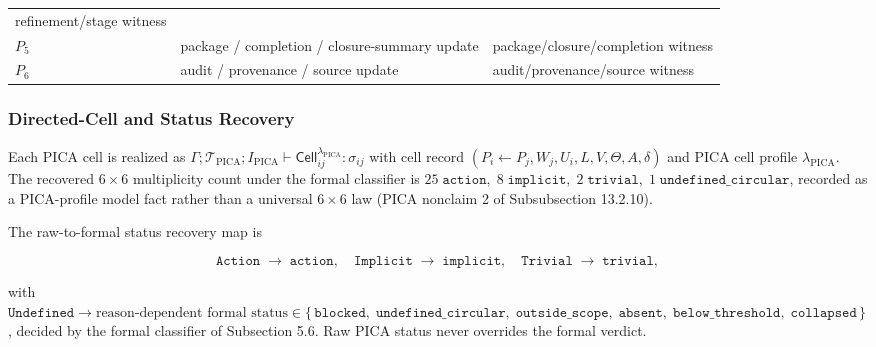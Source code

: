 \documentclass[11pt]{article}
\theoremstyle{definition}
\begin{document}
\begin{longtable}[]{@{}lll@{}}
\begin{minipage}[t]{0.37\columnwidth}
refinement/stage witness\strut
\end{minipage}\tabularnewline
\begin{minipage}[t]{0.08\columnwidth}\raggedright
\(P_{5}\)\strut
\end{minipage} & \begin{minipage}[t]{0.46\columnwidth}\raggedright
package / completion / closure-summary update\strut
\end{minipage} & \begin{minipage}[t]{0.37\columnwidth}\raggedright
package/closure/completion witness\strut
\end{minipage}\tabularnewline
\begin{minipage}[t]{0.08\columnwidth}\raggedright
\(P_{6}\)\strut
\end{minipage} & \begin{minipage}[t]{0.46\columnwidth}\raggedright
audit / provenance / source update\strut
\end{minipage} & \begin{minipage}[t]{0.37\columnwidth}\raggedright
audit/provenance/source witness\strut
\end{minipage}\tabularnewline
\bottomrule
\end{longtable}

\subsubsection{Directed-Cell and Status Recovery}

Each PICA cell is realized as \(\Gamma;\mathcal T_{\mathrm{PICA}};I_{\mathrm{PICA}}\vdash\mathsf{Cell}_{ij}^{\lambda_{\mathrm{PICA}}}:\sigma_{ij}\) with cell record \((P_{i}\leftarrow P_{j},W_{j},U_{i},L,V,\Theta,A,\delta)\) and PICA cell profile \(\lambda_{\mathrm{PICA}}\). The recovered \(6\times 6\) multiplicity count under the formal classifier is \(25\;\texttt{action},\;8\;\texttt{implicit},\;2\;\texttt{trivial},\;1\;\texttt{undefined\_circular}\), recorded as a PICA-profile model fact rather than a universal \(6\times 6\) law (PICA nonclaim 2 of Subsubsection 13.2.10).

The raw-to-formal status recovery map is

\[
\texttt{Action}\;\to\;\texttt{action},\quad\texttt{Implicit}\;\to\;\texttt{implicit},\quad\texttt{Trivial}\;\to\;\texttt{trivial},
\]

with \(\texttt{Undefined}\to\text{reason-dependent formal status}\in\{\,\texttt{blocked},\;\texttt{undefined\_circular},\;\texttt{outside\_scope},\;\texttt{absent},\;\texttt{below\_threshold},\;\texttt{collapsed}\,\}\), decided by the formal classifier of Subsection 5.6. Raw PICA status never overrides the formal verdict.
\end{document}
